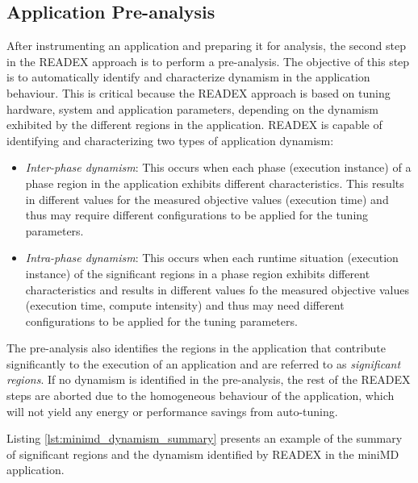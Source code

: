 \subsection{Application Pre-analysis}
\label{sec:dynamism_detection}
After instrumenting an application and preparing it for analysis, the second step in the READEX approach is to perform a pre-analysis. The objective of this step is to automatically identify and characterize dynamism in the application behaviour. This is critical because the READEX approach is based on tuning hardware, system and application parameters, depending on the dynamism exhibited by the different regions in the application. READEX is capable of identifying and characterizing two types of application dynamism:
\begin{itemize}
  \item \textit{Inter-phase dynamism}: This occurs when each phase (execution instance) of a phase region in the application exhibits different characteristics. This results in different values for the measured objective values (execution time) and thus may require different configurations to be applied for the tuning parameters.
  \item \textit{Intra-phase dynamism}: This occurs when each runtime situation (execution instance) of the significant regions in a phase region exhibits different characteristics and results in different values fo the measured objective values (execution time, compute intensity) and thus may need different configurations to be applied for the tuning parameters.
\end{itemize}
The pre-analysis also identifies the regions in the application that contribute significantly to the execution of an application and are referred to as \textit{significant regions}. If no dynamism is identified in the pre-analysis, the rest of the READEX steps are aborted due to the homogeneous behaviour of the application, which will not yield any energy or performance savings from auto-tuning.

Listing \ref{lst:minimd_dynamism_summary} presents an example of the summary of significant regions and the dynamism identified by READEX in the miniMD application.

